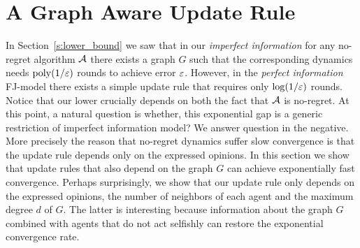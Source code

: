 \section{A Graph Aware Update Rule}\label{s:graph_aware}

In Section~\ref{s:lower_bound} we saw that in our \emph{imperfect information}
for any no-regret algorithm $\mathcal{A}$ there exists a graph $G$ such that the
corresponding dynamics needs \( \mathrm{poly}(1/\varepsilon) \) rounds to achieve error
$\varepsilon$.  However, in the \emph{perfect information} FJ-model there exists a
simple update rule that requires only $\log(1/\varepsilon)$ rounds.  Notice that our
lower crucially depends on both the fact that $\mathcal{A}$ is no-regret. At this
point, a natural question is whether, this exponential gap is a generic
restriction of imperfect information model?  We answer question in the
negative. More precisely the reason that no-regret dynamics suffer slow
convergence is that the update rule depends only on the expressed opinions. In
this section we show that update rules that also depend on the graph $G$ can
achieve exponentially fast convergence.  Perhaps surprisingly, we show that our
update rule only depends on the expressed opinions, the number of neighbors of
each agent and the maximum degree $d$ of $G$.  The latter is interesting
because information about the graph $G$ combined with agents that do not act
selfishly can restore the exponential convergence rate.

